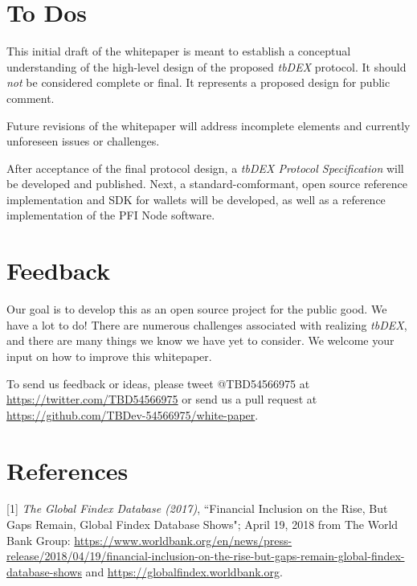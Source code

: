 \documentclass[11pt]{article}
\begin{document}
\vspace{1\baselineskip}
\section{To Dos}

\vspace{1\baselineskip}
This initial draft of the whitepaper is meant to establish a conceptual understanding of the high-level design of the proposed \textit{tbDEX} protocol. It should \textit{not} be considered complete or final. It represents a proposed design for public comment.  

\vspace{1\baselineskip}
Future revisions of the whitepaper will address incomplete elements and currently unforeseen issues or challenges. 

\vspace{1\baselineskip}
After acceptance of the final protocol design, a \textit{tbDEX Protocol Specification }will be developed and published. Next, a standard-comformant, open source reference implementation and SDK for wallets will be developed, as well as a reference implementation of the PFI Node software. 

\vspace{1\baselineskip}
\section{Feedback}

\vspace{1\baselineskip}
Our goal is to develop this as an open source project for the public good. We have a lot to do! There are numerous challenges associated with realizing \textit{tbDEX}, and there are many things we know we have yet to consider. We welcome your input on how to improve this whitepaper. 

\vspace{1\baselineskip}
To send us feedback or ideas, please tweet @TBD54566975 at \url{https://twitter.com/TBD54566975} or send us a pull request at \url{https://github.com/TBDev-54566975/white-paper}{\Large .}

\vspace{1\baselineskip}
\section{References}

[1] \textit{The Global Findex Database (2017)}, ``Financial Inclusion on the Rise, But Gaps Remain, Global Findex Database Shows"; April 19, 2018 from The World Bank Group: \url{https://www.worldbank.org/en/news/press-release/2018/04/19/financial-inclusion-on-the-rise-but-gaps-remain-global-findex-database-shows} and \url{https://globalfindex.worldbank.org}. 
\end{document}
